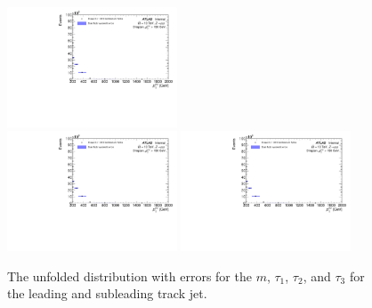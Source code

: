 \begin{figure}[h!]
  \includegraphics[page=600,width=0.45\textwidth]{figures/unfoldErrPlots.pdf} \\
  \includegraphics[page=432,width=0.45\textwidth]{figures/unfoldErrPlots.pdf}
  \includegraphics[page=628,width=0.45\textwidth]{figures/unfoldErrPlots.pdf}
  \caption{The unfolded distribution with errors for the $m$, $\tau_1$, $\tau_2$, and $\tau_3$ for the leading and subleading track jet.}
  \label{fig:unfoldErr3}
\end{figure}
